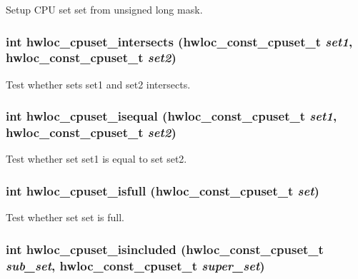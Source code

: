 Setup CPU set {\ttfamily set} from unsigned long {\ttfamily mask}. \hypertarget{group__hwlocality__cpuset_ga7f9ed2d6373d6c1b4f697b4c14ff1dc4}{
\subsubsection[{hwloc\_\-cpuset\_\-intersects}]{\setlength{\rightskip}{0pt plus 5cm}int hwloc\_\-cpuset\_\-intersects ({\bf hwloc\_\-const\_\-cpuset\_\-t} {\em set1}, \/  {\bf hwloc\_\-const\_\-cpuset\_\-t} {\em set2})}}
\label{group__hwlocality__cpuset_ga7f9ed2d6373d6c1b4f697b4c14ff1dc4}


Test whether sets {\ttfamily set1} and {\ttfamily set2} intersects. \hypertarget{group__hwlocality__cpuset_ga817f53201f0c04b12db42c562cd64993}{
\subsubsection[{hwloc\_\-cpuset\_\-isequal}]{\setlength{\rightskip}{0pt plus 5cm}int hwloc\_\-cpuset\_\-isequal ({\bf hwloc\_\-const\_\-cpuset\_\-t} {\em set1}, \/  {\bf hwloc\_\-const\_\-cpuset\_\-t} {\em set2})}}
\label{group__hwlocality__cpuset_ga817f53201f0c04b12db42c562cd64993}


Test whether set {\ttfamily set1} is equal to set {\ttfamily set2}. \hypertarget{group__hwlocality__cpuset_gac89f1c227a367732eabaaa48f8227355}{
\subsubsection[{hwloc\_\-cpuset\_\-isfull}]{\setlength{\rightskip}{0pt plus 5cm}int hwloc\_\-cpuset\_\-isfull ({\bf hwloc\_\-const\_\-cpuset\_\-t} {\em set})}}
\label{group__hwlocality__cpuset_gac89f1c227a367732eabaaa48f8227355}


Test whether set {\ttfamily set} is full. \hypertarget{group__hwlocality__cpuset_ga59a0cb0bbe3b32945768a06264891035}{
\subsubsection[{hwloc\_\-cpuset\_\-isincluded}]{\setlength{\rightskip}{0pt plus 5cm}int hwloc\_\-cpuset\_\-isincluded ({\bf hwloc\_\-const\_\-cpuset\_\-t} {\em sub\_\-set}, \/  {\bf hwloc\_\-const\_\-cpuset\_\-t} {\em super\_\-set})}}
\label{group__hwlocality__cpuset_ga59a0cb0bbe3b32945768a06264891035}


